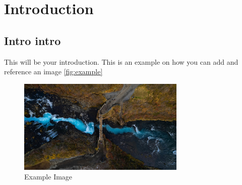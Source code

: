 \documentclass[../Main_PhD_Dissertation.tex]{subfiles}
\begin{document}
	
	\chapter{Introduction}
	\label{chap:Introduction}
	
	\section{Intro intro}
	
	This will be your introduction.
	This is an example on how you can add and reference an image \autoref{fig:example}

	
	\begin{figure}[!h]
		\centering
		\includegraphics[width=8cm]{3_Chapters/ImagesChapter1/exampleImage}
		\caption{Example Image}
		\label{fig:example}
	\end{figure}
	
	


	
\end{document}
